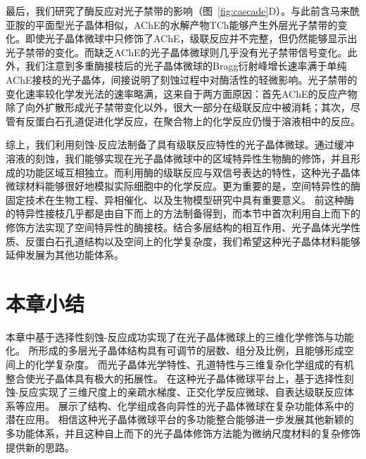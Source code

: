 最后，我们研究了酶反应对光子禁带的影响（图~\ref{fig:cascade}D）。与此前含马来酰亚胺的平面型光子晶体相似，AChE的水解产物TCh能够产生外层光子禁带的变化。即使光子晶体微球中只修饰了AChE，级联反应并不完整，但仍然能够显示出光子禁带的变化。而缺乏AChE的光子晶体微球则几乎没有光子禁带信号变化。此外，我们注意到多重酶接枝后的光子晶体微球的Bragg衍射峰增长速率满于单纯AChE接枝的光子晶体，间接说明了刻蚀过程中对酶活性的轻微影响。光子禁带的变化速率较化学发光法的速率略满，这来自于两方面原因：首先AChE的反应产物除了向外扩散形成光子禁带变化以外，很大一部分在级联反应中被消耗；其次，尽管有反蛋白石孔道促进化学反应，在聚合物上的化学反应仍慢于溶液相中的反应。

综上，我们利用刻蚀-反应法制备了具有级联反应特性的光子晶体微球。通过缓冲溶液的刻蚀，我们能够实现在光子晶体微球中的区域特异性生物酶的修饰，并且形成的功能区域互相独立。而利用酶的级联反应与双信号表达的特性，这种光子晶体微球材料能够很好地模拟实际细胞中的化学反应。更为重要的是，空间特异性的酶固定技术在生物工程、异相催化、以及生物模型研究中具有重要意义。
前这种酶的特异性接枝几乎都是由自下而上的方法制备得到\cite{Umler2010Coupled,Chandrawati2011Multicompartment}，而本节中首次利用自上而下的修饰方法实现了空间特异性的酶接枝。结合多层结构的相互作用、光子晶体光学性质、反蛋白石孔道结构以及空间上的化学复杂度，我们希望这种光子晶体材料能够延伸发展为其他功能体系。


\section{本章小结}
本章中基于选择性刻蚀-反应成功实现了在光子晶体微球上的三维化学修饰与功能化。
所形成的多层光子晶体结构具有可调节的层数、组分及比例，且能够形成空间上的化学复杂度。
而光子晶体光学特性、孔道特性与三维复杂化学组成的有机整合使光子晶体具有极大的拓展性。
在这种光子晶体微球平台上，基于选择性刻蚀-反应实现了三维尺度上的亲疏水梯度、正交化学反应微球、自表达级联反应体系等应用。
展示了结构、化学组成各向异性的光子晶体微球在复杂功能体系中的潜在应用。
相信这种光子晶体微球平台的多功能整合能够进一步发展其他新颖的多功能体系，并且这种自上而下的光子晶体修饰方法能为微纳尺度材料的复杂修饰提供新的思路。
